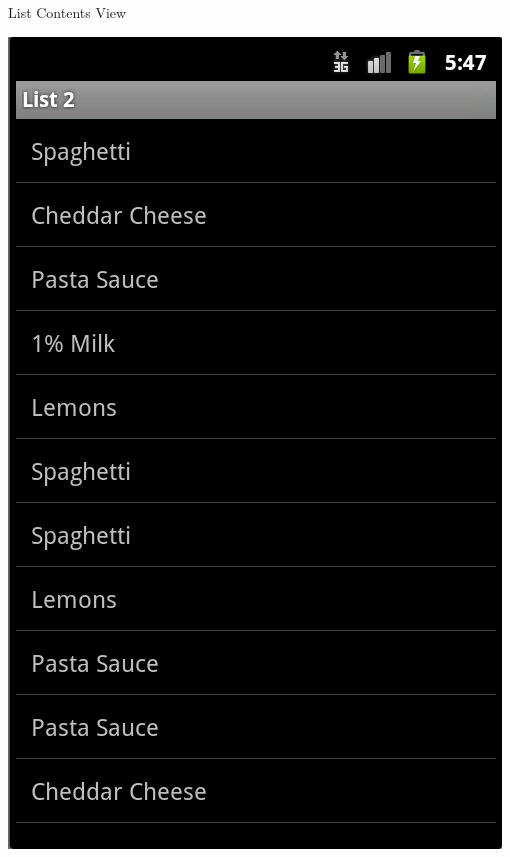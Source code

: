 \documentclass[t]{beamer}
\begin{document}
\begin{frame}{List Contents View}
    \begin{center}
        \includegraphics[scale=0.4]{../Graphics/List2_Contents.PNG}
    \end{center}
\end{frame}
\end{document}
